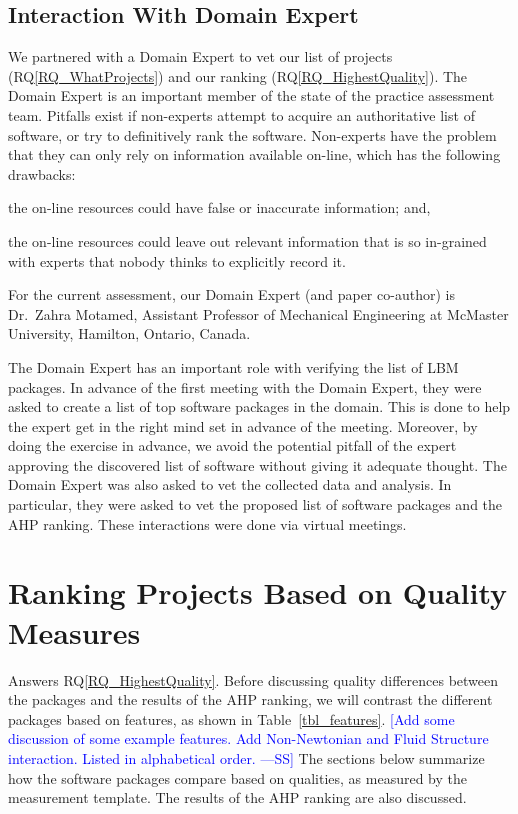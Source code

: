 \documentclass[final, 3p, times, authoryear]{elsarticle}
\newcommand{\authornote}[3]{\textcolor{#1}{[#3 ---#2]}}
\newcommand{\authornote}[3]{}
\newcommand{\wss}[1]{\authornote{blue}{SS}{#1}} %
\newcommand{\rqref}[1]{RQ\ref{#1}}
\begin{document}
\subsection{Interaction With Domain Expert} \label{sec_vet_software_list}

We partnered with a Domain Expert to vet our list of projects
(\rqref{RQ_WhatProjects}) and our ranking (\rqref{RQ_HighestQuality}).  The
Domain Expert is an important member of the state of the practice assessment
team. Pitfalls exist if non-experts attempt to acquire an authoritative list of
software, or try to definitively rank the software. Non-experts have the problem
that they can only rely on information available on-line, which has the
following drawbacks:
\begin{inparaenum}[i)]
  \item the on-line resources could have false or inaccurate information; and,
  \item the on-line resources could leave out relevant information that is so
in-grained with experts that nobody thinks to explicitly record it.
\end{inparaenum}
For the current assessment, our Domain Expert (and paper co-author) is Dr.\
Zahra Motamed, Assistant Professor of Mechanical Engineering at McMaster
University, Hamilton, Ontario, Canada.  

The Domain Expert has an important role with verifying the list of LBM packages.
In advance of the first meeting with the Domain Expert, they were asked to
create a list of top software packages in the domain.  This is done to help the
expert get in the right mind set in advance of the meeting.  Moreover, by doing
the exercise in advance, we avoid the potential pitfall of the expert approving
the discovered list of software without giving it adequate thought.  The Domain
Expert was also asked to vet the collected data and analysis.  In particular,
they were asked to vet the proposed list of software packages and the AHP
ranking.  These interactions were done via virtual meetings.

\section{Ranking Projects Based on Quality Measures} \label{AHPresults}

Answers \rqref{RQ_HighestQuality}.  Before discussing quality differences between the packages and the results of
the AHP ranking, we will contrast the different packages based on features, as
shown in Table~\ref{tbl_features}. \wss{Add some discussion of some example
features.  Add Non-Newtonian and Fluid Structure interaction.  Listed in
alphabetical order.}  The sections below summarize how the software packages
compare based on qualities, as measured by the measurement template.   The
results of the AHP ranking are also discussed.
\end{document}
